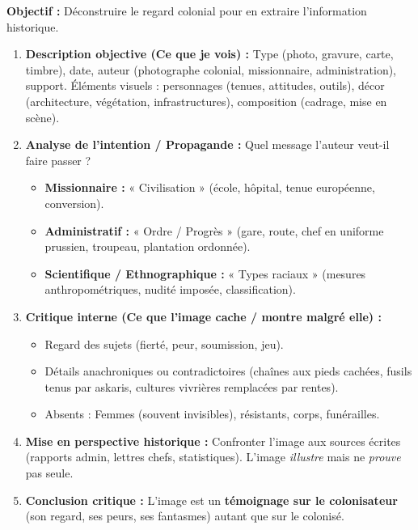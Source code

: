 \documentclass[11pt]{article}
\begin{document}
\begin{methode}
\textbf{Objectif :} Déconstruire le regard colonial pour en extraire l'information historique.
\begin{enumerate}
    \item \textbf{Description objective (Ce que je vois) :} Type (photo, gravure, carte, timbre), date, auteur (photographe colonial, missionnaire, administration), support. Éléments visuels : personnages (tenues, attitudes, outils), décor (architecture, végétation, infrastructures), composition (cadrage, mise en scène).
    \item \textbf{Analyse de l'intention / Propagande :} Quel message l'auteur veut-il faire passer ?
    \begin{itemize}
        \item \textbf{Missionnaire :} « Civilisation » (école, hôpital, tenue européenne, conversion).
        \item \textbf{Administratif :} « Ordre / Progrès » (gare, route, chef en uniforme prussien, troupeau, plantation ordonnée).
        \item \textbf{Scientifique / Ethnographique :} « Types raciaux » (mesures anthropométriques, nudité imposée, classification).
    \end{itemize}
    \item \textbf{Critique interne (Ce que l'image cache / montre malgré elle) :}
    \begin{itemize}
        \item Regard des sujets (fierté, peur, soumission, jeu).
        \item Détails anachroniques ou contradictoires (chaînes aux pieds cachées, fusils tenus par askaris, cultures vivrières remplacées par rentes).
        \item Absents : Femmes (souvent invisibles), résistants, corps, funérailles.
    \end{itemize}
    \item \textbf{Mise en perspective historique :} Confronter l'image aux sources écrites (rapports admin, lettres chefs, statistiques). L'image \emph{illustre} mais ne \emph{prouve} pas seule.
    \item \textbf{Conclusion critique :} L'image est un \textbf{témoignage sur le colonisateur} (son regard, ses peurs, ses fantasmes) autant que sur le colonisé.
\end{enumerate}
\end{methode}
\end{document}
